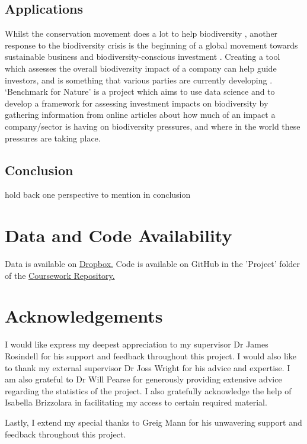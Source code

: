 \documentclass[11pt, a4paper, titlepage]{article}
\begin{document}
    \subsection*{Applications}
    Whilst the conservation movement does a lot to help biodiversity \citep{sandbrook2019global}, another response to the biodiversity crisis \citep{ogar2020science} is the beginning of a global movement towards sustainable business and biodiversity-conscious investment \citep{pri2020, worldeconomicforum2020, wwf2020}. Creating a tool which assesses the overall biodiversity impact of a company can help guide investors, and is something that various parties are currently developing \citep{worldbenchmarkingalliance_2022, iccs_2020}. `Benchmark for Nature' is a project which aims to use data science and to develop a framework for assessing investment impacts on biodiversity by gathering information from online articles about how much of an impact a company/sector is having on biodiversity pressures\citep{iccs_2020}, and where in the world these pressures are taking place. 
    \clearpage
    
    \subsection*{Conclusion}
    hold back one perspective to mention in conclusion
    
    \section*{Data and Code Availability}
    Data is available on \href{https://www.dropbox.com/sh/pnoxzydwgmj4eaf/AABYpBAkeQJsY3yqGH8G8J86a?dl=0}{Dropbox.} 
    Code is available on GitHub in the 'Project' folder of the \href{https://github.com/kayleigh-greenwood/CMEECoursework.git}{Coursework Repository.}
    
    \clearpage
    \section*{Acknowledgements}
    I would like express my deepest appreciation to my supervisor Dr James Rosindell for his support and feedback throughout this project. I would also like to thank my external supervisor Dr Joss Wright for his advice and expertise. I am also grateful to Dr Will Pearse for generously providing extensive advice regarding the statistics of the project. I also gratefully acknowledge the help of Isabella Brizzolara in facilitating my access to certain required material.
    
    Lastly, I extend my special thanks to Greig Mann for his unwavering support and feedback throughout this project.
    
    \newpage
    
    
\end{document}
